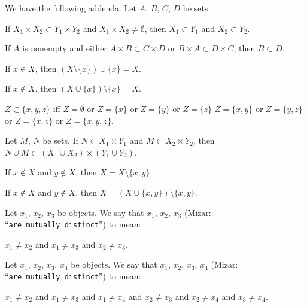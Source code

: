 \documentclass{article}
\begin{document}
We have the following addenda. Let $A$, $B$, $C$, $D$ be sets.
\begin{thm}
\item\label{zfmisc1:114} If $X_{1}\times X_{2}\subset Y_{1}\times Y_{2}$
  and $X_{1}\times X_{2}\neq\emptyset$, then $X_{1}\subset Y_{1}$ and
  $X_{2}\subset Y_{2}$.
\item\label{zfmisc1:115} If $A$ is nonempty and either $A\times B\subset C\times D$
  or $B\times A\subset D\times C$, then $B\subset D$.
\item\label{zfmisc1:116} If $x\in X$, then $(X\setminus\{x\})\cup\{x\}=X$.
\item\label{zfmisc1:117} If $x\notin X$, then $(X\cup\{x\})\setminus\{x\}=X$.
\item\label{zfmisc1:118} $Z\subset\{x,y,z\}$ iff
  $Z=\emptyset$ or
  $Z=\{x\}$ or $Z=\{y\}$ or $Z=\{z\}$
  $Z=\{x,y\}$ or $Z=\{y,z\}$ or $Z=\{x,z\}$ or
  $Z=\{x,y,z\}$.
\item\label{zfmisc1:119} Let $M$, $N$ be sets.
  If $N\subset X_{1}\times Y_{1}$ and $M\subset X_{2}\times Y_{2}$,
  then $N\cup M\subset(X_{1}\cup X_{2})\times(Y_{1}\cup Y_{2})$.
\item\label{zfmisc1:120} If $x\notin X$ and $y\notin X$, then $X=X\setminus\{x,y\}$.
\item\label{zfmisc1:121} If $x\notin X$ and $y\notin X$, then $X=(X\cup\{x,y\})\setminus\{x,y\}$.
\end{thm}

\begin{definition}
Let $x_{1}$, $x_{2}$, $x_{3}$ be objects.
We say that $x_{1}$, $x_{2}$, $x_{3}$ 
(Mizar: ``\verb#are_mutually_distinct#'') to mean:
\begin{defn}
\item $x_{1}\neq x_{2}$ and $x_{1}\neq x_{3}$ and  $x_{2}\neq x_{3}$.
\end{defn}
\end{definition}

\begin{definition}
Let $x_{1}$, $x_{2}$, $x_{3}$, $x_{4}$ be objects.
We say that $x_{1}$, $x_{2}$, $x_{3}$, $x_{4}$ 
(Mizar: ``\verb#are_mutually_distinct#'') to mean:
\begin{defn}
\item $x_{1}\neq x_{2}$ and $x_{1}\neq x_{3}$ and $x_{1}\neq x_{4}$ and
  $x_{2}\neq x_{3}$ and $x_{2}\neq x_{4}$ and $x_{3}\neq x_{4}$.
\end{defn}
\end{definition}
\end{document}
